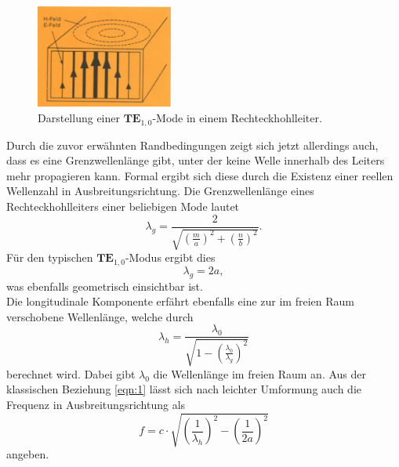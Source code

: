 \begin{figure}
    \centering
    \includegraphics[width=0.4\textwidth]{Bilder/mode.png}
    \caption{Darstellung einer $\textbf{TE}_{1,0}$-Mode in einem Rechteckhohlleiter. \cite{skript}} 
    \label{fig:4}
\end{figure}
Durch die zuvor erwähnten Randbedingungen zeigt sich jetzt allerdings auch, dass es eine Grenzwellenlänge gibt, unter der keine Welle innerhalb des Leiters mehr propagieren kann. Formal ergibt sich diese durch die Existenz einer reellen Wellenzahl 
in Ausbreitungsrichtung. 
Die Grenzwellenlänge eines Rechteckhohlleiters einer beliebigen Mode lautet
\begin{equation*}
\lambda_{g} = \frac{2}{\sqrt{\left(\frac{m}{a}\right)^2 + \left(\frac{n}{b}\right)^2}}.
\end{equation*}
Für den typischen $\textbf{TE}_{1,0}$-Modus ergibt dies 
\begin{equation*}
    \lambda_{g} = 2a,
\end{equation*}
was ebenfalls geometrisch einsichtbar ist.
\\
Die longitudinale Komponente erfährt ebenfalls eine zur im freien Raum verschobene Wellenlänge, welche durch
\begin{equation*}
    \lambda_{h} = \frac{\lambda_0}{\sqrt{1 - \left(\frac{\lambda_0}{\lambda_{g}}\right)^2}}
\end{equation*}
berechnet wird. Dabei gibt $\lambda_0$ die Wellenlänge im freien Raum an. Aus der klassischen Beziehung \ref{eqn:1} lässt sich nach leichter Umformung auch die Frequenz in Ausbreitungsrichtung als
\begin{equation}
    \label{eqn:222}
    f = c \cdot \sqrt{\left(\frac{1}{\lambda_h}\right)^2 - \left(\frac{1}{2a}\right)^2}
\end{equation}
angeben.


